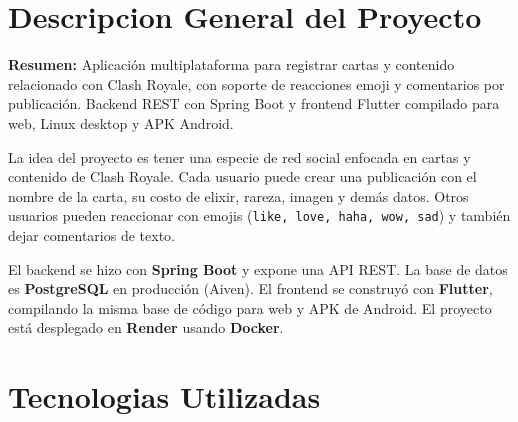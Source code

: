 \documentclass[12pt,a4paper]{article}
\begin{document}
\section{Descripcion General del Proyecto}

\begin{infobox}
\textbf{Resumen:} Aplicación multiplataforma para registrar cartas y contenido
relacionado con Clash Royale, con soporte de reacciones emoji y comentarios
por publicación. Backend REST con Spring Boot y frontend Flutter compilado
para web, Linux desktop y APK Android.
\end{infobox}

\vspace{0.5em}

La idea del proyecto es tener una especie de red social enfocada en
cartas y contenido de Clash Royale. Cada usuario puede crear una publicación
con el nombre de la carta, su costo de elixir, rareza, imagen y demás datos.
Otros usuarios pueden reaccionar con emojis (\texttt{like, love, haha, wow, sad}) y
también dejar comentarios de texto.

El backend se hizo con \textbf{Spring Boot} y expone una API REST. La
base de datos es \textbf{PostgreSQL} en producción (Aiven). El frontend
se construyó con \textbf{Flutter}, compilando la misma base de código para
web y APK de Android. El proyecto está desplegado en \textbf{Render}
usando \textbf{Docker}.

\section{Tecnologias Utilizadas}
\end{document}
